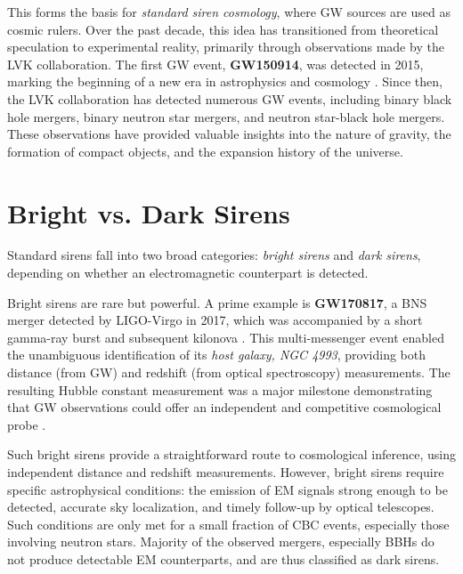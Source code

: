 This forms the basis for \textit{standard siren cosmology}, where \ac{GW} sources are used as cosmic rulers. Over the past decade, this idea has transitioned from theoretical speculation to experimental reality, primarily through observations made by the \ac{LVK} collaboration. The first \ac{GW} event, \textbf{GW150914}, was detected in 2015, marking the beginning of a new era in astrophysics and cosmology \citep{abbott2016gw150914}. Since then, the \ac{LVK} collaboration has detected numerous \ac{GW} events, including binary black hole mergers, binary neutron star mergers, and neutron star-black hole mergers. These observations have provided valuable insights into the nature of gravity, the formation of compact objects, and the expansion history of the universe.

\section{Bright vs. Dark Sirens}
Standard sirens fall into two broad categories: \textit{bright sirens} and \textit{dark sirens}, depending on whether an electromagnetic counterpart is detected.

Bright sirens are rare but powerful. A prime example is \textbf{GW170817}, a \ac{BNS} merger detected by LIGO-Virgo in 2017, which was accompanied by a short gamma-ray burst and subsequent kilonova \citep{LIGOScientific:2017adf}. This multi-messenger event enabled the unambiguous identification of its \textit{host galaxy, NGC 4993}, providing both distance (from \ac{GW}) and redshift (from optical spectroscopy) measurements. The resulting Hubble constant measurement was a major milestone demonstrating that \ac{GW} observations could offer an independent and competitive cosmological probe \citep{LIGOScientific:2017adf}.

Such bright sirens provide a straightforward route to cosmological inference, using independent distance and redshift measurements. However, bright sirens require specific astrophysical conditions: the emission of \ac{EM} signals strong enough to be detected, accurate sky localization, and timely follow-up by optical telescopes. Such conditions are only met for a small fraction of \ac{CBC} events, especially those involving neutron stars. Majority of the observed mergers, especially \acp{BBH} do not produce detectable \ac{EM} counterparts, and are thus classified as dark sirens.

